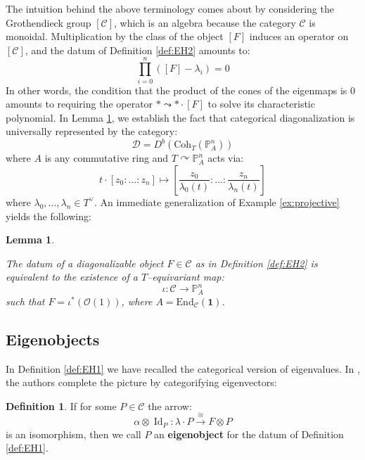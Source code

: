 \documentclass[12pt]{amsart}
\numberwithin{equation}{section}
\newtheorem{lemma}[theorem]{Lemma}
\theoremstyle{definition}
\newtheorem{definition}[theorem]{Definition}
\theoremstyle{remark}
\DeclareMathOperator{\Id}{Id}
\newcommand{\PP}{\mathbb{P}}
\newcommand{\cat}{\mathcal{C}}
\renewcommand{\CD}{\mathcal{D}}
\newcommand{\CO}{\mathcal{O}}
\renewcommand{\1}{\mathbf{1}}
\newcommand{\coh}{\mathrm{Coh}}
\newcommand{\End}{\mathrm{End}}
\begin{document}
The intuition behind the above terminology comes about by considering the Grothendieck group $[\cat]$, which is an algebra because the category $\cat$ is monoidal. Multiplication by the class of the object $[F]$ induces an operator on $[\cat]$, and the datum of Definition \ref{def:EH2} amounts to:
\begin{equation}
\label{eqn:charpoly}
\prod_{i=0}^n \left( [F]-\lambda_i \right) = 0
\end{equation}
In other words, the condition that the product of the cones of the eigenmaps is 0 amounts to requiring the operator $* \leadsto * \cdot [F]$ to solve its characteristic polynomial. In Lemma \ref{lem:universal}, we establish the fact that categorical diagonalization is universally represented by the category:
$$
\CD = D^b(\coh_T(\PP^n_A))
$$
where $A$ is any commutative ring and $T \curvearrowright \PP_A^n$ acts via: 
\begin{equation}
\label{eqn:action}
t \cdot [z_0:...:z_n] \mapsto \left[ \frac {z_0}{\lambda_0(t)}:...: \frac {z_n}{\lambda_n(t)} \right]
\end{equation}
where $\lambda_0,...,\lambda_n \in T^\vee$. An immediate generalization of Example \ref{ex:projective} yields the following:

\begin{lemma}
\label{lem:universal} 

The datum of a diagonalizable object $F \in \cat$ as in Definition \ref{def:EH2} is equivalent to the existence of a $T$--equivariant map: 
$$
\iota:\cat\to \PP^n_{A}
$$
such that $F = \iota^*\left(\CO(1)\right)$, where $A = \End_\cat(\1)$. 
\end{lemma}

\subsection{Eigenobjects}
\label{sub:eigenobjects}

In Definition \ref{def:EH1} we have recalled the categorical version of eigenvalues. In \cite{EH}, the authors complete the picture by categorifying eigenvectors: 
 
\begin{definition}
\label{def:EH3}
If for some $P \in \cat$ the arrow: 
\begin{equation}
\label{eqn:eigenobject}
\alpha \otimes \Id_P : \lambda\cdot P \stackrel{\cong}\longrightarrow F\otimes P
\end{equation}
is an isomorphism, then we call $P$ an \textbf{eigenobject} for the datum of Definition \ref{def:EH1}.
\end{definition}
\end{document}

